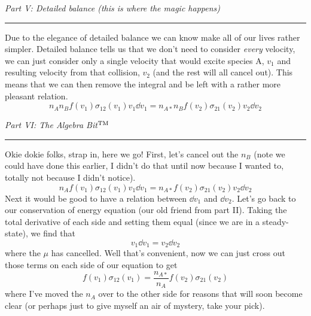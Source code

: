 \documentclass[12pt, letterpaper, twoside]{article}
\newcommand{\question}[1]{{\noindent \it #1}}
\newcommand{\answer}[1]{
    \par\noindent\rule{\textwidth}{0.4pt}#1\vspace{0.5cm}
}
\begin{document}
\question{Part V: Detailed balance (this is where the magic happens)}
\answer{
    Due to the elegance of detailed balance we can know make all of our lives rather simpler. Detailed balance tells us that we don't need to consider \emph{every} velocity, we can just consider only a single velocity that would excite species A, $v_1$ and resulting velocity from that collision, $v_2$ (and the rest will all cancel out). This means that we can then remove the integral and be left with a rather more pleasant relation.
    \begin{equation}
        \boxed{ n_A n_B f(v_1) \sigma_{12}(v_1) v_1 \dd{v_1} = n_{A*} n_B f(v_2) \sigma_{21}(v_2) v_2 \dd{v_2} }
    \end{equation}
}

\question{Part VI: The Algebra Bit$^{\rm TM}$}
\answer{
    Okie dokie folks, strap in, here we go! First, let's cancel out the $n_B$ (note we could have done this earlier, I didn't do that until now because I wanted to, totally not because I didn't notice).
    \begin{equation}
        n_A f(v_1) \sigma_{12}(v_1) v_1 \dd{v_1} = n_{A*} f(v_2) \sigma_{21}(v_2) v_2 \dd{v_2}
    \end{equation}
    Next it would be good to have a relation between $\dd{v_1}$ and $\dd{v_2}$. Let's go back to our conservation of energy equation (our old friend from part II). Taking the total derivative of each side and setting them equal (since we are in a steady-state), we find that
    \begin{equation}
        v_1 \dd{v_1} = v_2 \dd{v_2}
    \end{equation}
    where the $\mu$ has cancelled. Well that's convenient, now we can just cross out those terms on each side of our equation to get
    \begin{equation}
        f(v_1) \sigma_{12}(v_1) = \frac{n_{A*}}{n_A} f(v_2) \sigma_{21}(v_2)
    \end{equation}
    where I've moved the $n_A$ over to the other side for reasons that will soon become clear (or perhaps just to give myself an air of mystery, take your pick).
    
}
\end{document}
